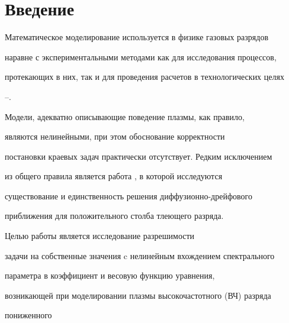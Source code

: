 \date{}




\pagestyle{plain} %







\maketitle


\label{begin}





\section*{Введение}





Математическое моделирование используется в физике газовых разрядов 


наравне с экспериментальными методами как для исследования процессов,


протекающих в них, так и для проведения расчетов в технологических целях 


\cite{Dresvin}--\cite{ZltRaizer}. 


Модели, адекватно описывающие поведение плазмы, как правило,


являются нелинейными, при этом обоснование корректности


постановки краевых задач практически отсутствует. Редким исключением


из общего правила является работа \cite{Islam}, в которой исследуются


существование и единственность решения диффузионно-дрейфового 


приближения для положительного столба тлеющего разряда.





Целью работы является исследование разрешимости 


задачи на собственные значения c нелинейным вхождением спектрального


параметра в коэффициент и весовую функцию уравнения,


возникающей при моделировании плазмы высокочастотного (ВЧ) разряда 


пониженного 


